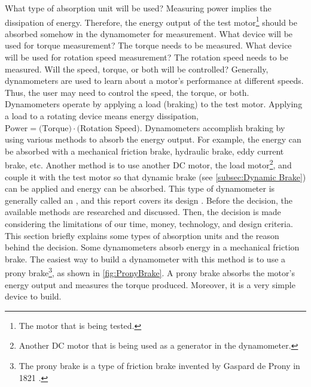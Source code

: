 {}\markdownRendererOlBegin
{}What type of absorption unit will be used?\markdownRendererInterblockSeparator
{}Measuring power implies the dissipation of energy. Therefore, the energy output of the test motor\footnote{The motor that is being tested.} should be absorbed somehow in the dynamometer for measurement.\markdownRendererOlItemEnd 
{}What device will be used for torque measurement?\markdownRendererInterblockSeparator
{}The torque needs to be measured.\markdownRendererOlItemEnd 
{}What device will be used for rotation speed measurement?\markdownRendererInterblockSeparator
{}The rotation speed needs to be measured.\markdownRendererOlItemEnd 
{}Will the speed, torque, or both will be controlled?\markdownRendererInterblockSeparator
{}Generally, dynamometers are used to learn about a motor's performance at different speeds. Thus, the user may need to control the speed, the torque, or both.\markdownRendererOlItemEnd 
\markdownRendererOlEnd \markdownRendererInterblockSeparator
{}\markdownRendererInterblockSeparator
{}Dynamometers operate by applying a load (braking) to the test motor. Applying a load to a rotating device means energy dissipation, $\text{Power}=\text{(Torque)}\cdot\text{(Rotation Speed)}$.\markdownRendererInterblockSeparator
{}Dynamometers accomplish braking by using various methods to absorb the energy output. For example, the energy can be absorbed with a mechanical friction brake, hydraulic brake, eddy current brake, etc. Another method is to use another DC motor, the load motor\footnote{Another DC motor that is being used as a generator in the dynamometer.}, and couple it with the test motor so that dynamic brake (see \autoref{subsec:Dynamic Brake}) can be applied and energy can be absorbed. This type of dynamometer is generally called an , and this report covers its design \cite{474Book}.\markdownRendererInterblockSeparator
{}Before the decision, the available methods are researched and discussed. Then, the decision is made considering the limitations of our time, money, technology, and design criteria. This section briefly explains some types of absorption units and the reason behind the decision.\markdownRendererInterblockSeparator
{}\markdownRendererInterblockSeparator
{}Some dynamometers absorb energy in a mechanical friction brake. The easiest way to build a dynamometer with this method is to use a prony brake\footnote{The prony brake is a type of friction brake invented by Gaspard de Prony in 1821 \cite{PronyHistory}.}, as shown in \autoref{fig:PronyBrake}. A prony brake absorbs the motor's energy output and measures the torque produced. Moreover, it is a very simple device to build.\markdownRendererInterblockSeparator
